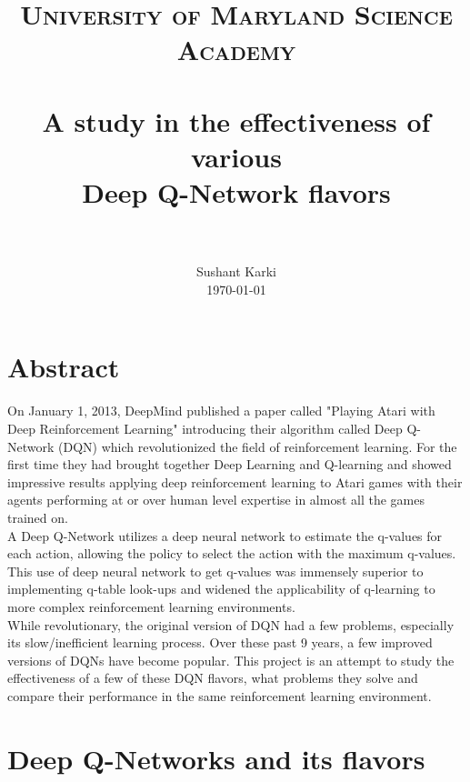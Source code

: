\documentclass[paper=a4, fontsize=11pt, margin=1in]{scrartcl}
\title{
		\usefont{OT1}{bch}{b}{n}
		\normalfont \normalsize \textsc{University of Maryland Science Academy} \\ [25pt]
		\horrule{0.5pt} \\[0.4cm]
		\huge A study in the effectiveness of various \\Deep Q-Network flavors  \\
		\horrule{2pt} \\[0.5cm]
}
\author{
		\normalfont 								\normalsize
        Sushant Karki\\[-3pt]		\normalsize
        \today
}
\date{}
\numberwithin{equation}{section}		%
\numberwithin{figure}{section}			%
\numberwithin{table}{section}				%
\begin{document}
\maketitle
\section{\textbf{Abstract}}

On January 1, 2013, DeepMind published a paper called "Playing Atari with Deep Reinforcement Learning" introducing their algorithm called Deep Q-Network (DQN) which revolutionized the field of reinforcement learning. For the first time they had brought together Deep Learning and Q-learning and showed impressive results applying deep reinforcement learning to Atari games with their agents performing at or over human level expertise in almost all the games trained on.\\

A Deep Q-Network utilizes a deep neural network to estimate the q-values for each action, allowing the policy to select the action with the maximum q-values. This use of deep neural network to get q-values was immensely superior to implementing q-table look-ups and widened the applicability of q-learning to more complex reinforcement learning environments.\\

While revolutionary, the original version of DQN had a few problems, especially its slow/inefficient learning process. Over these past 9 years, a few improved versions of DQNs have become popular. This project is an attempt to study the effectiveness of a few of these DQN flavors, what problems they solve and compare their performance in the same reinforcement learning environment.


\pagebreak
\section{Deep Q-Networks and its flavors}
\end{document}
